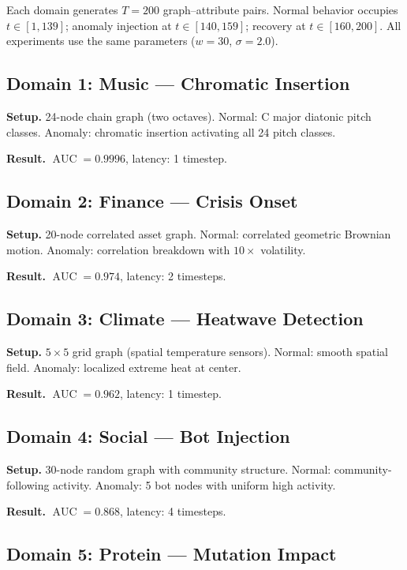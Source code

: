 \documentclass[11pt,a4paper]{article}
\DeclareMathOperator{\AUC}{AUC}
\begin{document}
Each domain generates $T = 200$ graph--attribute pairs.  Normal behavior occupies
$t \in [1, 139]$; anomaly injection at $t \in [140, 159]$; recovery at
$t \in [160, 200]$.  All experiments use the same parameters ($w=30$,
$\sigma=2.0$).

\subsection{Domain 1: Music --- Chromatic Insertion}

\textbf{Setup.} 24-node chain graph (two octaves).  Normal: C major diatonic
pitch classes.  Anomaly: chromatic insertion activating all 24 pitch classes.

\textbf{Result.} $\AUC = 0.9996$, latency: 1 timestep.

\subsection{Domain 2: Finance --- Crisis Onset}

\textbf{Setup.} 20-node correlated asset graph.  Normal: correlated geometric
Brownian motion.  Anomaly: correlation breakdown with $10\times$ volatility.

\textbf{Result.} $\AUC = 0.974$, latency: 2 timesteps.

\subsection{Domain 3: Climate --- Heatwave Detection}

\textbf{Setup.} $5 \times 5$ grid graph (spatial temperature sensors).  Normal:
smooth spatial field.  Anomaly: localized extreme heat at center.

\textbf{Result.} $\AUC = 0.962$, latency: 1 timestep.

\subsection{Domain 4: Social --- Bot Injection}

\textbf{Setup.} 30-node random graph with community structure.  Normal:
community-following activity.  Anomaly: 5 bot nodes with uniform high activity.

\textbf{Result.} $\AUC = 0.868$, latency: 4 timesteps.

\subsection{Domain 5: Protein --- Mutation Impact}
\end{document}
